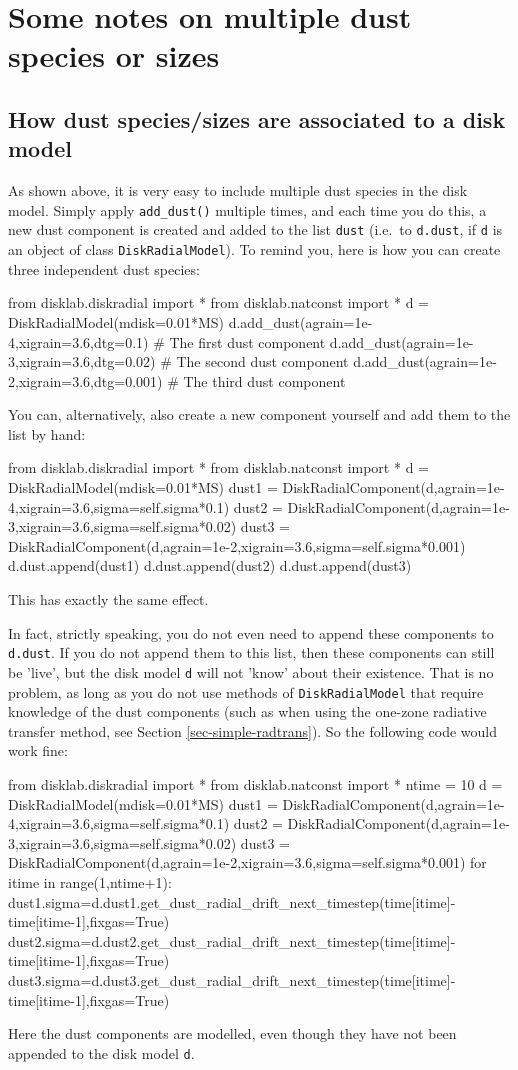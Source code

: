 \documentclass{book}
\newcommand{\code}[1]{{\small\tt #1}}
\begin{document}
\section{Some notes on multiple dust species or sizes}
\label{sec-multi-dust-spec}
%
\subsection{How dust species/sizes are associated to a disk model}
As shown above, it is very easy to include multiple dust species in the disk
model. Simply apply \code{add\_dust()} multiple times, and each time you do
this, a new dust component is created and added to the list \code{dust}
(i.e.\ to \code{d.dust}, if \code{d} is an object of class \code{DiskRadialModel}).
To remind you, here is how you can create three independent dust species:
\begin{codebox}
from disklab.diskradial import *
from disklab.natconst import *
d = DiskRadialModel(mdisk=0.01*MS)
d.add_dust(agrain=1e-4,xigrain=3.6,dtg=0.1)   # The first dust component
d.add_dust(agrain=1e-3,xigrain=3.6,dtg=0.02)  # The second dust component
d.add_dust(agrain=1e-2,xigrain=3.6,dtg=0.001) # The third dust component
\end{codebox}
You can, alternatively, also create a new component yourself and add them
to the list by hand:
\begin{codebox}
from disklab.diskradial import *
from disklab.natconst import *
d = DiskRadialModel(mdisk=0.01*MS)
dust1 = DiskRadialComponent(d,agrain=1e-4,xigrain=3.6,sigma=self.sigma*0.1)
dust2 = DiskRadialComponent(d,agrain=1e-3,xigrain=3.6,sigma=self.sigma*0.02)
dust3 = DiskRadialComponent(d,agrain=1e-2,xigrain=3.6,sigma=self.sigma*0.001)
d.dust.append(dust1)
d.dust.append(dust2)
d.dust.append(dust3)
\end{codebox}
This has exactly the same effect.

In fact, strictly speaking, you do not even need to append these components to
\code{d.dust}. If you do not append them to this list, then these components can
still be 'live', but the disk model \code{d} will not 'know' about their
existence. That is no problem, as long as you do not use methods of
\code{DiskRadialModel} that require knowledge of the dust components (such as when
using the one-zone radiative transfer method, see Section
\ref{sec-simple-radtrans}). So the following code would work fine:
\begin{codebox}
from disklab.diskradial import *
from disklab.natconst import *
ntime  = 10
d = DiskRadialModel(mdisk=0.01*MS)
dust1 = DiskRadialComponent(d,agrain=1e-4,xigrain=3.6,sigma=self.sigma*0.1)
dust2 = DiskRadialComponent(d,agrain=1e-3,xigrain=3.6,sigma=self.sigma*0.02)
dust3 = DiskRadialComponent(d,agrain=1e-2,xigrain=3.6,sigma=self.sigma*0.001)
for itime in range(1,ntime+1):
   dust1.sigma=d.dust1.get_dust_radial_drift_next_timestep(time[itime]-time[itime-1],fixgas=True)
   dust2.sigma=d.dust2.get_dust_radial_drift_next_timestep(time[itime]-time[itime-1],fixgas=True)
   dust3.sigma=d.dust3.get_dust_radial_drift_next_timestep(time[itime]-time[itime-1],fixgas=True)
\end{codebox}
Here the dust components are modelled, even though they have not been appended
to the disk model \code{d}.
\end{document}
